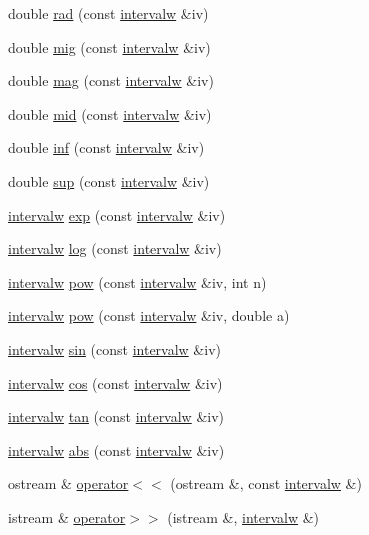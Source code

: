 \begin{DoxyCompactItemize}
\item 
double \hyperlink{classintervalw_a12ede7a3ebc9d53639cfc206a604315c}{rad} (const \hyperlink{classintervalw}{intervalw} \&iv)
\item 
double \hyperlink{classintervalw_af7a230bd4822540118d9262c8cc584cb}{mig} (const \hyperlink{classintervalw}{intervalw} \&iv)
\item 
double \hyperlink{classintervalw_ad4b44123b488321c4535a9f2502d1b4c}{mag} (const \hyperlink{classintervalw}{intervalw} \&iv)
\item 
double \hyperlink{classintervalw_a09db5d53cae5c76961deec09de08d45a}{mid} (const \hyperlink{classintervalw}{intervalw} \&iv)
\item 
double \hyperlink{classintervalw_ade8b34ba61cd3b5e27f2ee941ff7f58d}{inf} (const \hyperlink{classintervalw}{intervalw} \&iv)
\item 
double \hyperlink{classintervalw_ab1515f06b5edad4bf3cbe8f161e16960}{sup} (const \hyperlink{classintervalw}{intervalw} \&iv)
\item 
\hyperlink{classintervalw}{intervalw} \hyperlink{classintervalw_abd1a5aaf103125ed55c08bc2db4ca750}{exp} (const \hyperlink{classintervalw}{intervalw} \&iv)
\item 
\hyperlink{classintervalw}{intervalw} \hyperlink{classintervalw_a5be9ad7219570c9bd0c6bb6ea86de535}{log} (const \hyperlink{classintervalw}{intervalw} \&iv)
\item 
\hyperlink{classintervalw}{intervalw} \hyperlink{classintervalw_a8acd3286f74b74fde8d8625f1c435033}{pow} (const \hyperlink{classintervalw}{intervalw} \&iv, int n)
\item 
\hyperlink{classintervalw}{intervalw} \hyperlink{classintervalw_a0590b37b782675339010208b12d7a8fe}{pow} (const \hyperlink{classintervalw}{intervalw} \&iv, double a)
\item 
\hyperlink{classintervalw}{intervalw} \hyperlink{classintervalw_a343a4929223ce0df95f5263d1514d6c1}{sin} (const \hyperlink{classintervalw}{intervalw} \&iv)
\item 
\hyperlink{classintervalw}{intervalw} \hyperlink{classintervalw_ac5879f5cdc5992837630e854723a0d46}{cos} (const \hyperlink{classintervalw}{intervalw} \&iv)
\item 
\hyperlink{classintervalw}{intervalw} \hyperlink{classintervalw_ad25279b895e7bc58f7c44728ae3f3921}{tan} (const \hyperlink{classintervalw}{intervalw} \&iv)
\item 
\hyperlink{classintervalw}{intervalw} \hyperlink{classintervalw_a4709833a0cab9e743e16d8f6c7f5a901}{abs} (const \hyperlink{classintervalw}{intervalw} \&iv)
\item 
ostream \& \hyperlink{classintervalw_a2578659a3edd4d9d52f9b0ec55446c9e}{operator$<$$<$} (ostream \&, const \hyperlink{classintervalw}{intervalw} \&)
\item 
istream \& \hyperlink{classintervalw_aee76b7cde6b462aec3e58173cdf8388a}{operator$>$$>$} (istream \&, \hyperlink{classintervalw}{intervalw} \&)
\end{DoxyCompactItemize}


